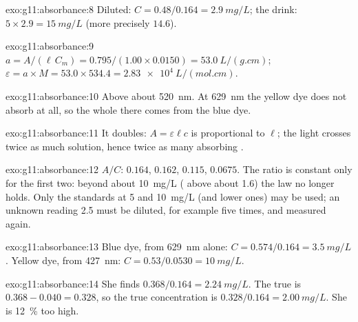 \begin{solution}{exo:g11:absorbance:8}
Diluted: $C = 0.48 / 0.164 = \qty{2.9}{mg/L}$; the drink:
$5 \times 2.9 = \qty{15}{mg/L}$ (more precisely $14.6$).
\end{solution}

\begin{solution}{exo:g11:absorbance:9}
$a = A / (\ell\, C_m) = 0.795 / (1.00 \times 0.0150) = \qty{53.0}{L/(g.cm)}$;
$\varepsilon = a \times M = 53.0 \times 534.4 = \qty{2.83e4}{L/(mol.cm)}$.
\end{solution}

\begin{solution}{exo:g11:absorbance:10}
Above about \qty{520}{nm}. At \qty{629}{nm} the yellow dye does not
absorb at all, so the whole  there comes from the blue dye.
\end{solution}

\begin{solution}{exo:g11:absorbance:11}
It doubles: $A = \varepsilon \ell c$ is proportional to $\ell$; the light
crosses twice as much solution, hence twice as many absorbing .
\end{solution}

\begin{solution}{exo:g11:absorbance:12}
$A/C$: $0.164$, $0.162$, $0.115$, $0.0675$. The ratio is constant only
for the first two: beyond about \qty{10}{mg/L} ( above about
1.6) the law no longer holds. Only the standards at 5 and \qty{10}{mg/L}
(and lower ones) may be used; an unknown reading 2.5 must be diluted, for
example five times, and measured again.
\end{solution}

\begin{solution}{exo:g11:absorbance:13}
Blue dye, from \qty{629}{nm} alone: $C = 0.574 / 0.164 = \qty{3.5}{mg/L}$.
Yellow dye, from \qty{427}{nm}: $C = 0.53 / 0.0530 = \qty{10}{mg/L}$.
\end{solution}

\begin{solution}{exo:g11:absorbance:14}
She finds $0.368 / 0.164 = \qty{2.24}{mg/L}$. The true  is
$0.368 - 0.040 = 0.328$, so the true concentration is
$0.328 / 0.164 = \qty{2.00}{mg/L}$. She is \qty{12}{\percent} too high.
\end{solution}

